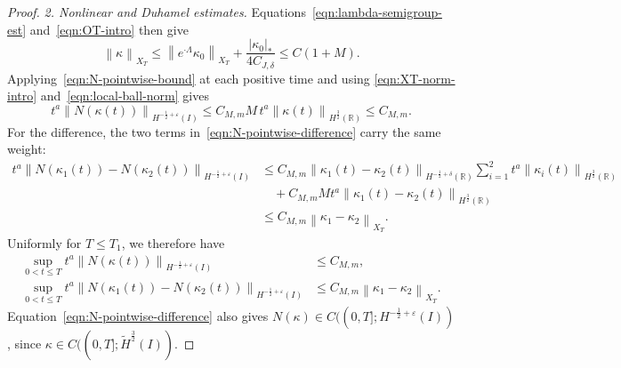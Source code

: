 \documentclass[11pt,reqno]{amsart}
\theoremstyle{plain}
\theoremstyle{definition}
\numberwithin{equation}{section}
\newcommand{\wt}[1]{\widetilde{#1}}
\newcommand{\abs}[1]{\left\lvert #1 \right\rvert}
\newcommand{\norm}[1]{\left\lVert #1 \right\rVert}
\newcommand{\R}{\mathbb{R}}
\newcommand{\hi}[1]{H^{#1}(I)}
\newcommand{\thi}[1]{\wt H^{#1}(I)}
\newcommand{\hr}[1]{H^{#1}(\R)}
\begin{document}
\begin{proof}
\emph{2. Nonlinear and Duhamel estimates.}
Equations~\eqref{eqn:lambda-semigroup-est} and~\eqref{eqn:OT-intro} then give
\begin{equation}\label{eqn:local-ball-norm}
    \norm{\kappa}_{X_T}
    \le \norm{e^{\cdot\Lambda}\kappa_0}_{X_T}
       +\frac{\abs{\kappa_0}_*}{4C_{J,\delta}}
    \le C(1+M).
\end{equation}
Applying~\eqref{eqn:N-pointwise-bound} at each positive time and using
\eqref{eqn:XT-norm-intro} and~\eqref{eqn:local-ball-norm} gives
\begin{equation*}
    t^a\norm{N(\kappa(t))}_{\hi{-\frac12+\varepsilon}}
    \le C_{M,m}M\,t^a\norm{\kappa(t)}_{\hr{\frac32}}
    \le C_{M,m}.
\end{equation*}
For the difference, the two terms in~\eqref{eqn:N-pointwise-difference}
carry the same weight:
\begin{equation*}
\begin{aligned}
    t^a\norm{N(\kappa_1(t))-N(\kappa_2(t))}_{\hi{-\frac12+\varepsilon}}
    &\le C_{M,m}\norm{\kappa_1(t)-\kappa_2(t)}_{\hr{-\frac12+\delta}}
        \sum_{i=1}^2 t^a\norm{\kappa_i(t)}_{\hr{\frac32}}\\
    &\quad+C_{M,m}M t^a
        \norm{\kappa_1(t)-\kappa_2(t)}_{\hr{\frac32}}\\
    &\le C_{M,m}\norm{\kappa_1-\kappa_2}_{X_T}.
\end{aligned}
\end{equation*}
Uniformly for $T\le T_1$, we therefore have
\begin{equation}\label{eqn:local-nonlinear-bounds}
\begin{aligned}
    \sup_{0<t\le T}t^a
    \norm{N(\kappa(t))}_{\hi{-\frac12+\varepsilon}}
    &\le C_{M,m},\\
    \sup_{0<t\le T}t^a
    \norm{N(\kappa_1(t))-N(\kappa_2(t))}_{\hi{-\frac12+\varepsilon}}
    &\le C_{M,m}\norm{\kappa_1-\kappa_2}_{X_T}.
\end{aligned}
\end{equation}
Equation~\eqref{eqn:N-pointwise-difference} also gives
$N(\kappa)\in C((0,T];\hi{-\frac12+\varepsilon})$, since
$\kappa\in C((0,T];\thi{\frac32})$.


\end{proof}
\end{document}
